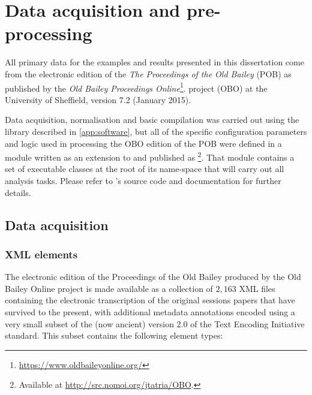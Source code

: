 \chapter{Data acquisition and pre-processing}
\label{app:obo_proc}

All primary data for the examples and results presented in this dissertation come from the electronic edition of the \emph{The Proceedings of the Old Bailey} (POB) as published by the \emph{Old Bailey Proceedings Online}\footnote{
    \url{https://www.oldbaileyonline.org/}
}. project (OBO) at the University of Sheffield, version 7.2 (January 2015).

Data acquisition, normalisation and basic compilation was carried out using the  library described in \autoref{app:software}, but all of the specific configuration parameters and logic used in processing the OBO edition of the POB were defined in a module written as an extension to  and published as \footnote{
    Available at \url{http://src.nomoi.org/jtatria/OBO}.
}.
That module contains a set of executable classes at the root of its name-space that will carry out all analysis tasks.
Please refer to 's source code and documentation for further details.

\section{Data acquisition}

\subsection{XML elements}

The electronic edition of the Proceedings of the Old Bailey produced by the Old Bailey Online project is made available as a collection of $2,163$ XML files containing the electronic transcription of the original sessions papers that have survived to the present, with additional metadata annotations encoded using a very small subset of the (now ancient) version 2.0 of the Text Encoding Initiative standard.
This subset contains the following element types:

